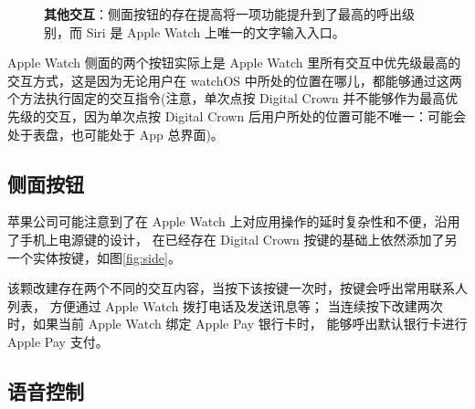 \begin{figure}[H]
    \kaishu
    \centering
    \caption{\textbf{其他交互}：侧面按钮的存在提高将一项功能提升到了最高的呼出级别，而 Siri 是 Apple Watch 上唯一的文字输入入口。}
    \label{fig:others}
\end{figure}

Apple Watch 侧面的两个按钮实际上是 Apple Watch 里所有交互中优先级最高的交互方式，这是因为无论用户在 watchOS 中所处的位置在哪儿，都能够通过这两个方法执行固定的交互指令(注意，单次点按 Digital Crown 并不能够作为最高优先级的交互，因为单次点按 Digital Crown 后用户所处的位置可能不唯一：可能会处于表盘，也可能处于 App 总界面)。

\subsection{侧面按钮}

苹果公司可能注意到了在 Apple Watch 上对应用操作的延时复杂性和不便，沿用了手机上电源键的设计，
在已经存在 Digital Crown 按键的基础上依然添加了另一个实体按键，如图\ref{fig:side}。

该颗改建存在两个不同的交互内容，当按下该按键一次时，按键会呼出常用联系人列表，
方便通过 Apple Watch 拨打电话及发送讯息等；
当连续按下改建两次时，如果当前 Apple Watch 绑定 Apple Pay 银行卡时，
能够呼出默认银行卡进行 Apple Pay 支付。

\subsection{语音控制}

